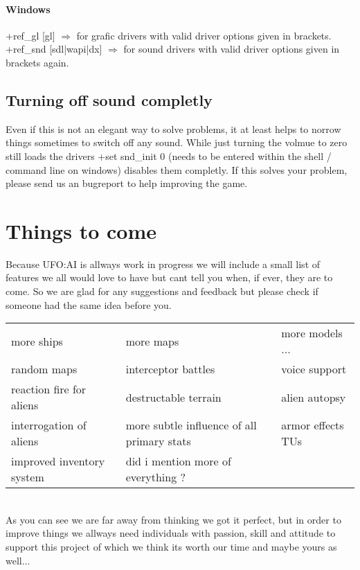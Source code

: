 \paragraph*{Windows}
+ref_gl [gl] $\Longrightarrow$ for grafic drivers with valid driver options given in brackets.
+ref_snd [sdl|wapi|dx] $\Longrightarrow$ for sound drivers with valid driver options given in brackets 																						again.

\subsection{Turning off sound completly}
Even if this is not an elegant way to solve problems, it at least helps to norrow things sometimes to switch off any sound. While just turning the volmue to zero still loads the drivers +set snd_init 0 (needs to be entered within the shell / command line on windows) disables them completly. If this solves your problem, please send us an bugreport to help improving the game.


\section{Things to come}
Because UFO:AI is allways work in progress we will include a small list of features we all would love to have but cant tell you when, if ever, they are to come. So we are glad for any suggestions and feedback but please check if someone had the same idea before you.
\\
\begin{tabular}{lll}
more ships  & more maps & more models ...   \\ 
random maps & interceptor battles & voice support \\ 
reaction fire for aliens  & destructable terrain & alien autopsy \\ 
interrogation of aliens  & more subtle influence of all primary stats & armor effects TUs \\ 
improved inventory system & did i mention more of everything ? &  \\ 
\end{tabular} 
\\
As you can see we are far away from thinking we got it perfect, but in order to improve things we allways need individuals with passion, skill and attitude to support this project of which we think its worth our time and maybe yours as well...
